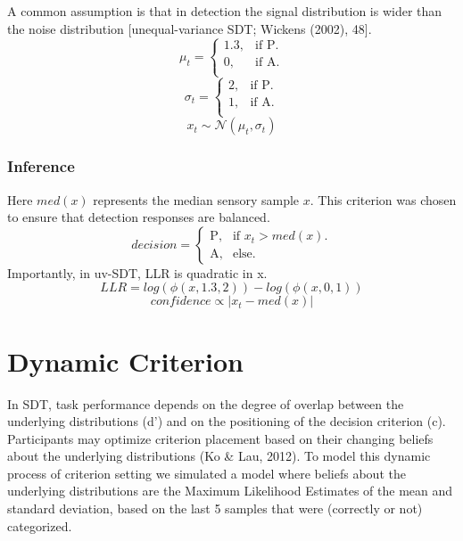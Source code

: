 \documentclass[12pt,twoside]{reedthesis}
\begin{document}
A common assumption is that in detection the signal distribution is wider than the noise distribution {[}unequal-variance SDT; Wickens (2002), 48{]}.
\begin{equation}
  \mu_t=\begin{cases}
    1.3, & \text{if P}.\\
    0, & \text{if A}.\\
  \end{cases}
\end{equation}
\begin{equation}
  \sigma_t=\begin{cases}
    2, & \text{if P}.\\
    1, & \text{if A}.\\
  \end{cases}
\end{equation}
\begin{equation}
   x_t \sim \mathcal{N}(\mu_t,\sigma_t)    
\end{equation}
\hypertarget{inference-3}{%
\subsubsection*{Inference}\label{inference-3}}

Here \(med(x)\) represents the median sensory sample \(x\). This criterion was chosen to ensure that detection responses are balanced.
\begin{equation}
  decision=\begin{cases}
    \text{P}, & \text{if } x_t>med(x).\\
    \text{A}, & \text{else}.
  \end{cases}
\end{equation}
Importantly, in uv-SDT, LLR is quadratic in x.
\begin{equation}
LLR = log(\phi(x,1.3,2))-log(\phi(x,0,1))
\end{equation}
\begin{equation}
confidence \propto |x_t-med(x)|
\end{equation}
\hypertarget{app3-Dynamic}{%
\section{Dynamic Criterion}\label{app3-Dynamic}}

In SDT, task performance depends on the degree of overlap between the underlying distributions (d') and on the positioning of the decision criterion (c). Participants may optimize criterion placement based on their changing beliefs about the underlying distributions (Ko \& Lau, 2012). To model this dynamic process of criterion setting we simulated a model where beliefs about the underlying distributions are the Maximum Likelihood Estimates of the mean and standard deviation, based on the last 5 samples that were (correctly or not) categorized.
\end{document}
